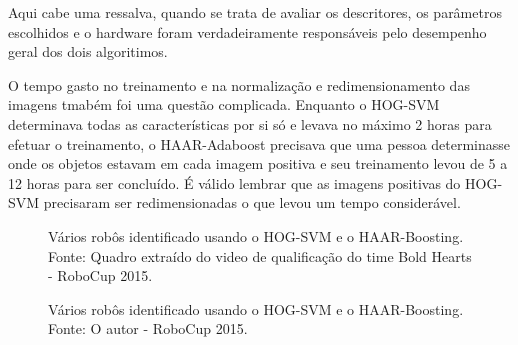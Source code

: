 Aqui cabe uma ressalva, quando se trata de avaliar os descritores, os parâmetros escolhidos e o hardware foram verdadeiramente responsáveis pelo desempenho geral dos dois algoritimos.

O tempo gasto no treinamento e na normalização e redimensionamento das imagens tmabém foi uma questão complicada. Enquanto o HOG-SVM determinava todas as características por si só e levava no máximo 2 horas para efetuar o treinamento, o HAAR-Adaboost precisava que uma pessoa determinasse onde os objetos estavam em cada imagem positiva e seu treinamento levou de 5 a 12 horas para ser concluído. É válido lembrar que as imagens positivas do HOG-SVM precisaram ser redimensionadas o que levou um tempo considerável.


\begin{figure}[!hH]%
    \centering
    \qquad
    \caption{Vários robôs identificado usando o HOG-SVM e o HAAR-Boosting. Fonte: Quadro extraído do video de qualificação do time Bold Hearts - RoboCup 2015.}%
    \label{fig:Mix1}%
\end{figure}

\begin{figure}[!hH]%
    \centering
    \qquad
    \caption{Vários robôs identificado usando o HOG-SVM e o HAAR-Boosting. Fonte: O autor - RoboCup 2015.}%
    \label{fig:Mix2}%
\end{figure}

\pagebreak

